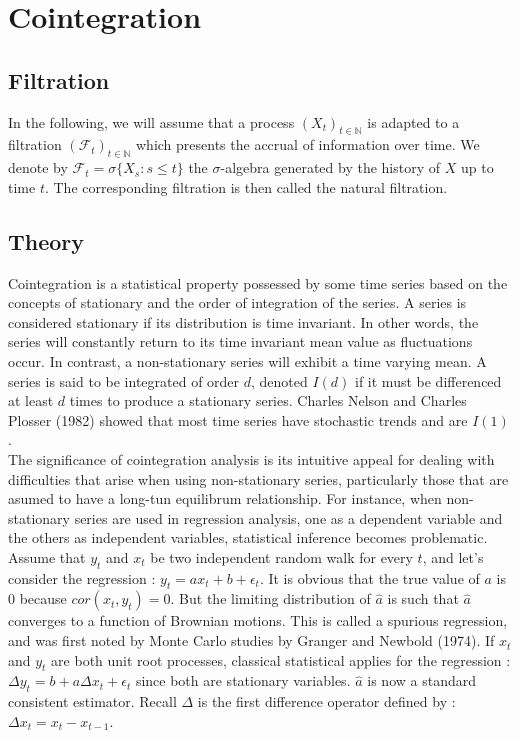 \documentclass[11pt,a4,twosided,singlespacing,titlepagenumber=on]{scrreprt}
\numberwithin{equation}{chapter} %
\theoremstyle{remark}
\begin{document}


\chapter{Cointegration}

\section{Filtration}
In the following, we will assume that a process $(X_t)_{t \in \mathbb{N}}$ is adapted to a filtration $(\mathcal{F}_t)_{t \in \mathbb{N}}$ which presents the accrual of information over time. We denote by $\mathcal{F}_t = \sigma \{X_s : s \leq t \}$ the $\sigma$-algebra generated by the history of $X$ up to time $t$. The corresponding filtration is then called the natural filtration.

\section{Theory}
Cointegration is a statistical property possessed by some time series based on the concepts of stationary and the order of integration of the series. A series is considered stationary if its distribution is time invariant. In other words, the series will constantly return to its time invariant mean value as fluctuations occur. In contrast, a non-stationary series will exhibit a time varying mean. A series is said to be integrated of order $d$, denoted $I(d)$ if it must be differenced at least $d$ times to produce a stationary series.
Charles Nelson and Charles Plosser (1982) showed that most time series have stochastic trends and are $I(1)$. \\

The significance of cointegration analysis is its intuitive appeal for dealing with difficulties that arise when using non-stationary series, particularly those that are asumed to have a long-tun equilibrum relationship. For instance, when non-stationary series are used in regression analysis, one as a dependent variable and the others as independent variables, statistical inference becomes problematic. Assume that $y_t$ and $x_t$ be two independent random walk for every $t$, and let's consider the regression : $y_t = a x_t + b + \epsilon_t$. It is obvious that the true value of $a$ is 0 because $cor(x_t, y_t) = 0$. But the limiting distribution of $\hat{a}$ is such that $\hat{a}$ converges to a function of Brownian motions. This is called a spurious regression, and was first noted by Monte Carlo studies by Granger and Newbold (1974). If $x_t$ and $y_t$ are both unit root processes, classical statistical applies for the regression : $\Delta y_t = b + a \Delta x_t + \epsilon_t$ since both are stationary variables. $\hat{a}$ is now a standard consistent estimator. Recall $\Delta$ is the first difference operator defined by : $\Delta x_t = x_t - x_{t-1}$. \\
\end{document}

